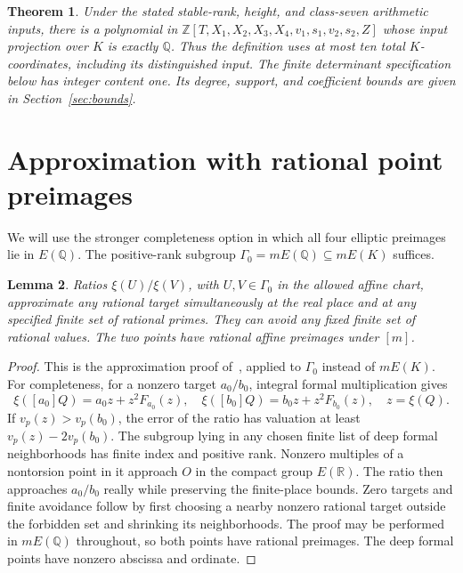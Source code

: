 \documentclass[11pt,a4paper]{article}
\newtheorem{theorem}{Theorem}[section]
\newtheorem{lemma}[theorem]{Lemma}
\newcommand{\Q}{\mathbb Q}\newcommand{\Z}{\mathbb Z}
\begin{document}
\begin{theorem}\label{thm:main}
Under the stated stable-rank, height, and class-seven arithmetic inputs,
there is a polynomial in \(\Z[T,X_1,X_2,X_3,X_4,v_1,s_1,v_2,s_2,Z]\)
whose input projection over \(K\) is exactly \(\Q\).
Thus the definition uses at most ten total \(K\)-coordinates,
including its distinguished input.
The finite determinant specification below has integer content one.
Its degree, support, and coefficient bounds are given in
Section~\ref{sec:bounds}.
\end{theorem}

\section{Approximation with rational point preimages}

We will use the stronger completeness option in which all four
elliptic preimages lie in \(E(\Q)\). The positive-rank subgroup
\(\Gamma_0=mE(\Q)\subseteq mE(K)\) suffices.

\begin{lemma}\label{lem:approx}
Ratios \(\xi(U)/\xi(V)\), with
\(U,V\in\Gamma_0\) in the allowed affine chart, approximate any rational
target simultaneously at the real place and at any specified finite
set of rational primes. They can avoid any fixed finite set of rational
values. The two points have rational affine preimages under \([m]\).
\end{lemma}
\begin{proof}
This is the approximation proof of~\cite{amplified}, applied to
\(\Gamma_0\) instead of \(mE(K)\). For completeness, for a nonzero
target \(a_0/b_0\), integral formal multiplication gives
\[
 \xi([a_0]Q)=a_0z+z^2F_{a_0}(z),\quad
 \xi([b_0]Q)=b_0z+z^2F_{b_0}(z),\quad z=\xi(Q).
\]
If \(v_p(z)>v_p(b_0)\), the error of the ratio has valuation at least
\(v_p(z)-2v_p(b_0)\). The subgroup lying in any chosen finite list
of deep formal neighborhoods has finite index and positive rank.
Nonzero multiples of a nontorsion point in it approach \(O\) in the
compact group \(E(\mathbb R)\). The ratio then approaches \(a_0/b_0\)
really while preserving the finite-place bounds. Zero targets and
finite avoidance follow by first choosing a nearby nonzero rational
target outside the forbidden set and shrinking its neighborhoods.
The proof may be performed in \(mE(\Q)\) throughout, so both points
have rational preimages. The deep formal points have nonzero
abscissa and ordinate.
\end{proof}
\end{document}
